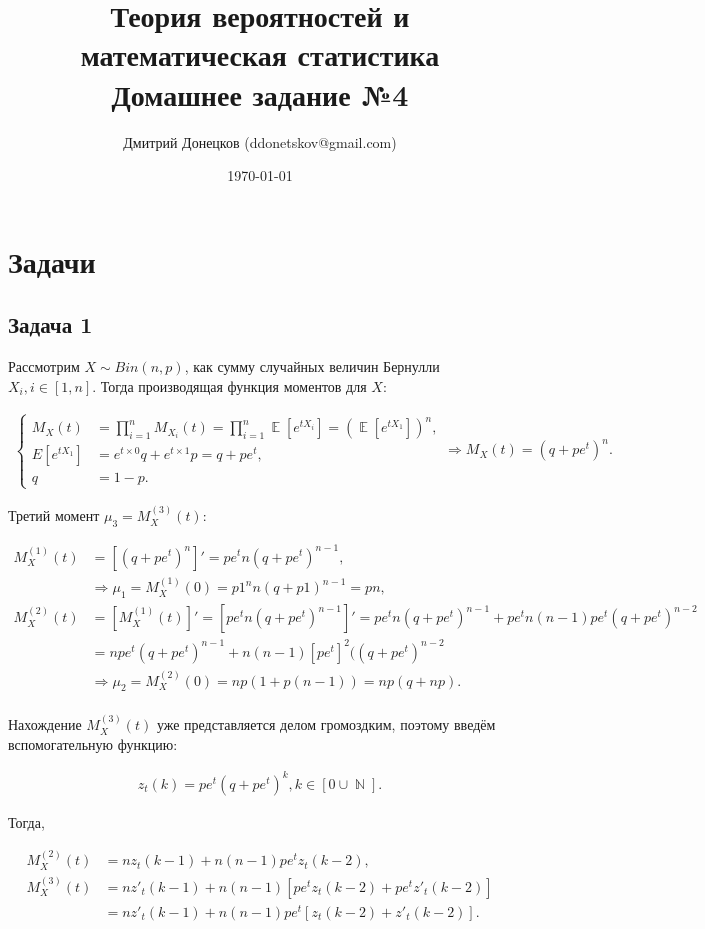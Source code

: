 \documentclass[a4paper,11pt]{article}
\title{\vspace{-1.5cm}Теория вероятностей и математическая статистика \\
Домашнее задание №4}
\author{Дмитрий Донецков (ddonetskov@gmail.com)}
\date{\today}
\DeclareMathOperator*{\E}{\mathbb{E}}   %
\DeclareMathOperator*{\N}{\mathbb{N}}   %
\begin{document}
\maketitle

\section{Задачи}

\subsection{Задача 1}

Рассмотрим $X \sim Bin(n, p)$, как сумму случайных величин Бернулли $X_i, i \in [1,n]$. Тогда производящая функция моментов для $X$:

\begin{align*}
\begin{cases}
  M_X(t) & = \prod_{i=1}^{n} M_{X_i}(t) = \prod_{i=1}^{n} \E[e^{tX_i}] = (\E[e^{tX_1}])^n, \\
  E[e^{tX_1}] & = e^{t \times 0}q + e^{t \times 1}p = q + pe^t, \\
  q & = 1 -p.
\end{cases}
\Rightarrow
\boxed{M_X(t) = (q + pe^t)^n}.
\end{align*}

Третий момент $\mu_3 = M^{(3)}_X(t)$:

\begin{align*}
M^{(1)}_X(t) & = [(q + pe^t)^n]' = pe^tn(q+pe^t)^{n-1},\\
  & \Rightarrow
  \mu_1 = M^{(1)}_X(0) = p1^nn(q+p1)^{n-1} = \boxed{pn}, \\
M^{(2)}_X(t) & = [M^{(1)}_X(t)]' = [pe^tn(q+pe^t)^{n-1}]' = pe^tn(q+pe^t)^{n-1} + pe^tn(n-1)pe^t(q+pe^t)^{n-2}\\
& = npe^t(q+pe^t)^{n-1} + n(n-1)[pe^t]^2((q+pe^t)^{n-2} \\
  & \Rightarrow
  \mu_2 = M^{(2)}_X(0) = np(1+p(n-1)) = \boxed{np(q+np)}.\\
\end{align*}

Нахождение $M^{(3)}_X(t)$ уже представляется делом громоздким, поэтому введём вспомогательную функцию:

\begin{align*}
z_t(k) = pe^t(q+pe^t)^k, k \in [0\cup\N].
\end{align*}

Тогда,

\begin{align*}
M^{(2)}_X(t) & = nz_t(k-1) + n(n-1)pe^tz_t(k-2), \\
M^{(3)}_X(t) & = nz'_t(k-1) + n(n-1)[pe^tz_t(k-2) + pe^tz'_t(k-2)] \\
 &= nz'_t(k-1) + n(n-1)pe^t[z_t(k-2) + z'_t(k-2)]. \\
\end{align*}
\end{document}
